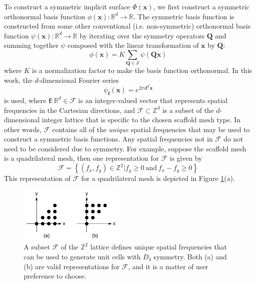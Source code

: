 \documentclass[acmtog]{acmart}
\begin{document}
To construct a symmetric implicit surface $\Phi(\mathbf{x})$, we first construct a symmetric orthonormal basis function $\phi(\mathbf{x}): \mathbb{R}^d \rightarrow \mathbb{R}$. The symmetric basis function is constructed from some other conventional (i.e. non-symmetric) orthonormal basis function $\psi(\mathbf{x}): \mathbb{R}^d \rightarrow \mathbb{R}$ by iterating over the symmetry operators $\mathbf{Q}$ and summing together $\psi$ composed with the linear transformation of $\mathbf{x}$ by $\mathbf{Q}$:
%
\begin{equation}
  \label{eq:basis_function}
  \phi(\mathbf{x}) = K \sum\limits_{\mathbf{Q} \in \mathcal{S}} \psi(\mathbf{Qx})
\end{equation}
%
where $K$ is a normalization factor to make the basis function orthonormal. In this work, the $d$-dimensional Fourier series
%
\begin{equation}
  \label{eq:fourier_series}
  \psi_{\mathbf{f}}(\mathbf{x}) = e^{2\pi i \mathbf{f}^T \mathbf{x}}
\end{equation}
%
is used, where $\mathbf{f}: \mathbb{R}^d \in \mathcal{F}$ is an integer-valued vector that represents spatial frequencies in the Cartesian directions, and $\mathcal{F} \subset \mathbb{Z}^d$ is a subset of the $d$-dimensional integer lattice that is specific to the chosen scaffold mesh type. In other words, $\mathcal{F}$ contains all of the \textit{unique} spatial frequencies that may be used to construct a symmetric basis functions. Any spatial frequencies not in $\mathcal{F}$ do not need to be considered due to symmetry. For example, suppose the scaffold mesh is a quadrilateral mesh, then one representation for $\mathcal{F}$ is given by
%
\begin{equation}
  \mathcal{F} = \left\{ (f_x, f_y) \in \mathbb{Z}^2 | f_y \geq 0 \: \text{and} \: f_x - f_y \geq 0 \right\}
\end{equation}
%
This representation of $\mathcal{F}$ for a quadrilateral mesh is depicted in Figure \ref{fig:unique_freqs_quad}(a).
%
\begin{figure}
  \centering
  \includegraphics[width=0.45\textwidth]{figures/quad_z_lattice_points.pdf}
  \caption{A subset $\mathcal{F}$ of the $\mathbb{Z}^2$ lattice defines unique spatial frequencies that can be used to generate unit cells with $D_4$ symmetry. Both (a) and (b) are valid representations for $\mathcal{F}$, and it is a matter of user preference to choose.}
  \label{fig:unique_freqs_quad}
\end{figure}
\end{document}
